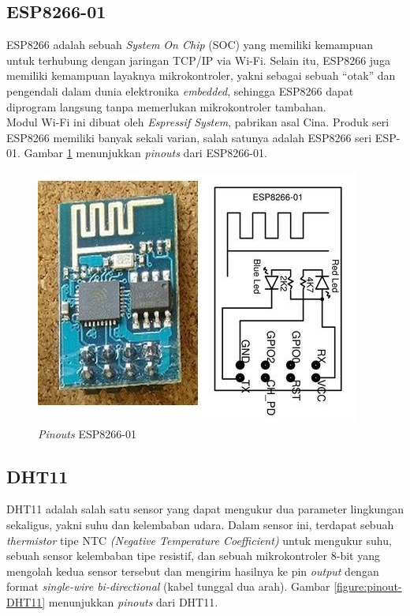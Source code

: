 \subsection{ESP8266-01}
\tab ESP8266 adalah sebuah \textit{System On Chip} (SOC) yang memiliki kemampuan untuk terhubung dengan jaringan TCP/IP via Wi-Fi. Selain itu, ESP8266 juga memiliki kemampuan layaknya mikrokontroler, yakni sebagai sebuah “otak” dan  pengendali dalam dunia elektronika \textit{embedded}, sehingga ESP8266 dapat diprogram langsung tanpa memerlukan mikrokontroler tambahan. \\
\tab Modul Wi-Fi ini dibuat oleh \textit{Espressif System}, pabrikan asal Cina. Produk seri ESP8266 memiliki banyak sekali varian, salah satunya adalah ESP8266 seri ESP-01. Gambar \ref{figure:ESP8266-01} menunjukkan \textit{pinouts} dari ESP8266-01.

\begin{figure}[H]
	\centerline {
		\includegraphics[width=\linewidth]{bab3/img/ESP8266-01.jpg}
	}
	\caption{\textit{Pinouts} ESP8266-01}
	\label{figure:ESP8266-01}
\end{figure}

\subsection{DHT11}
\tab DHT11 adalah salah satu sensor yang dapat mengukur dua parameter lingkungan sekaligus, yakni suhu dan kelembaban udara. Dalam sensor ini, terdapat sebuah \textit{thermistor} tipe NTC \textit{(Negative Temperature Coefficient)} untuk mengukur suhu, sebuah sensor kelembaban tipe resistif, dan sebuah mikrokontroler 8-bit yang mengolah kedua sensor tersebut dan mengirim hasilnya ke pin \textit{output} dengan format \textit{single-wire bi-directional} (kabel tunggal dua arah). Gambar \ref{figure:pinout-DHT11} menunjukkan \textit{pinouts} dari DHT11.

